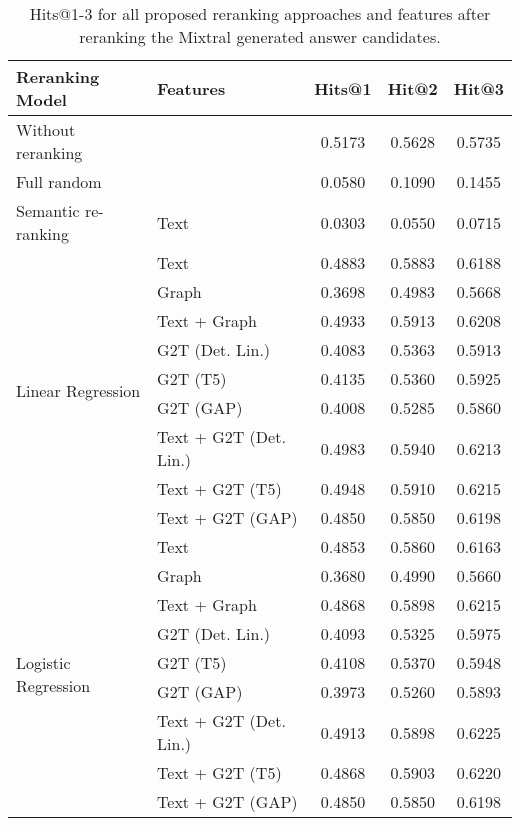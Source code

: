 \begin{table}[htbp]
    \caption{Hits@1-3 for all proposed reranking approaches and features after reranking the Mixtral generated answer candidates.}
    \label{tab:controllable_fusion:mixtral_all_result1}
    \centering
    \begin{tabular}{l p{6cm} c c c}
        \toprule
        \textbf{Reranking Model} & \textbf{Features} & \textbf{Hits@1} & \textbf{Hit@2} & \textbf{Hit@3} \\
        \midrule
        Without reranking & & 0.5173 & 0.5628 & 0.5735 \\
        \cmidrule(lr){1-5}
        Full random & & 0.0580 & 0.1090 & 0.1455 \\
        \cmidrule(lr){1-5}
        Semantic re-ranking & Text & 0.0303 & 0.0550 & 0.0715 \\
        \cmidrule(lr){1-5}
        \multirow{9}{*}{Linear Regression} & Text & 0.4883 & 0.5883 & 0.6188 \\
        & Graph & 0.3698 & 0.4983 & 0.5668 \\
        & Text + Graph & 0.4933 & 0.5913 & 0.6208 \\
        & G2T (Det. Lin.) & 0.4083 & 0.5363 & 0.5913 \\
        & G2T (T5) & 0.4135 & 0.5360 & 0.5925 \\
        & G2T (GAP) & 0.4008 & 0.5285 & 0.5860 \\
        & Text + G2T (Det. Lin.) & 0.4983 & 0.5940 & 0.6213 \\
        & Text + G2T (T5) & 0.4948 & 0.5910 & 0.6215 \\
        & Text + G2T (GAP) & 0.4850 & 0.5850 & 0.6198 \\
        \midrule
        \multirow{12}{*}{Logistic Regression} & Text & 0.4853 & 0.5860 & 0.6163 \\
        & Graph & 0.3680 & 0.4990 & 0.5660 \\
        & Text + Graph & 0.4868 & 0.5898 & 0.6215 \\
        & G2T (Det. Lin.) & 0.4093 & 0.5325 & 0.5975 \\
        & G2T (T5) & 0.4108 & 0.5370 & 0.5948 \\
        & G2T (GAP) & 0.3973 & 0.5260 & 0.5893 \\
        & Text + G2T (Det. Lin.) & 0.4913 & 0.5898 & 0.6225 \\
        & Text + G2T (T5) & 0.4868 & 0.5903 & 0.6220 \\
        & Text + G2T (GAP) & 0.4850 & 0.5850 & 0.6198 \\
        \bottomrule
    \end{tabular}
\end{table}

